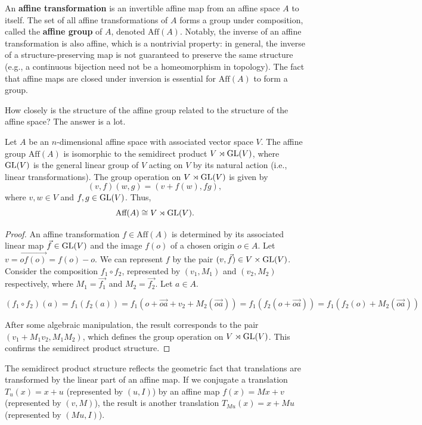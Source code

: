 \begin{definition}
    An \textbf{affine transformation} is an invertible affine map from an affine space $A$ to itself. The set of all affine transformations of $A$ forms a group under composition, called the \textbf{affine group} of $A$, denoted $\text{Aff}(A)$. Notably, the inverse of an affine transformation is also affine, which is a nontrivial property: in general, the inverse of a structure-preserving map is not guaranteed to preserve the same structure (e.g., a continuous bijection need not be a homeomorphism in topology). The fact that affine maps are closed under inversion is essential for $\text{Aff}(A)$ to form a group.
\end{definition}

How closely is the structure of the affine group related to the structure of the affine space? The answer is a lot.

\begin{theorem}
Let $A$ be an $n$-dimensional affine space with associated vector space $V$. The affine group $\text{Aff}(A)$ is isomorphic to the semidirect product $V \rtimes \mathrm{GL}(V)$, where $\mathrm{GL}(V)$ is the general linear group of $V$ acting on $V$ by its natural action (i.e., linear transformations). The group operation on $V \rtimes \mathrm{GL}(V)$ is given by
\[
(v, f)(w, g) = (v + f(w), fg),
\]
where $v, w \in V$ and $f, g \in \mathrm{GL}(V)$. Thus,
\[
\text{Aff}(A) \cong V \rtimes \mathrm{GL}(V).
\]
\end{theorem}

\begin{proof}
An affine transformation $f \in \text{Aff}(A)$ is determined by its associated linear map $\vec{f} \in \mathrm{GL}(V)$ and the image $f(o)$ of a chosen origin $o \in A$. Let $v = \vec{of(o)} = f(o) - o$. We can represent $f$ by the pair $(v, \vec{f}) \in V \times \mathrm{GL}(V)$. Consider the composition $f_1 \circ f_2$, represented by $(v_1, M_1)$ and $(v_2, M_2)$ respectively, where $M_1 = \vec{f_1}$ and $M_2 = \vec{f_2}$. Let $a \in A$.

\[
(f_1 \circ f_2)(a) = f_1(f_2(a)) = f_1(o + \vec{oa} + v_2 + M_2(\vec{oa})) = f_1(f_2(o + \vec{oa})) = f_1(f_2(o) + M_2(\vec{oa}))
\]

After some algebraic manipulation, the result corresponds to the pair $(v_1 + M_1 v_2, M_1 M_2)$, which defines the group operation on $V \rtimes \mathrm{GL}(V)$. This confirms the semidirect product structure.
\end{proof}

The semidirect product structure reflects the geometric fact that translations are transformed by the linear part of an affine map. If we conjugate a translation $T_u(x) = x + u$ (represented by $(u, I)$) by an affine map $f(x) = Mx + v$ (represented by $(v, M)$), the result is another translation $T_{Mu}(x) = x + Mu$ (represented by $(Mu, I)$).

